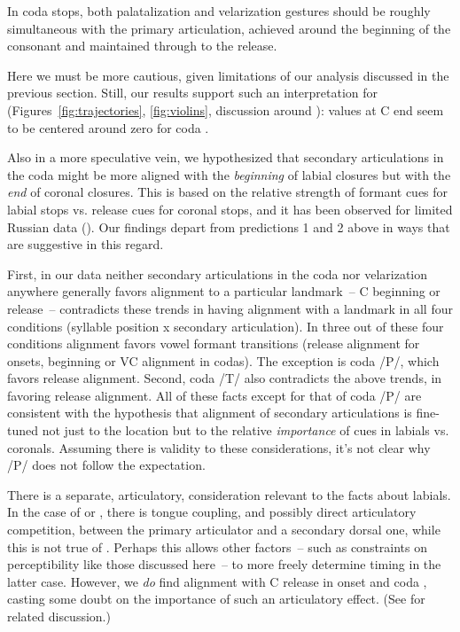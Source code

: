\documentclass[output=paper,colorlinks,citecolor=brown]{langscibook}
\newcommand{\pal}{\ipa{ʲ}}
\newcommand{\vel}{\ipa{ˠ}}
\begin{document}
\begin{exe}
 In coda stops, both palatalization and velarization gestures should be roughly simultaneous with the primary articulation, achieved around the beginning of the consonant and maintained through to the release. 
\end{exe}

Here we must be more cautious, given limitations of our analysis discussed in the previous section. Still, our results support such an interpretation for \ipa{/T\vel\ K\pal\ K\vel/} (Figures~\ref{fig:trajectories}, \ref{fig:violins}, discussion around ): values at C end seem to be centered around zero for coda \ipa{/T\vel\ K\pal\ K\vel/}.

Also in a more speculative vein, we hypothesized that secondary articulations in the coda might be more aligned with the \emph{beginning} of labial closures but with the \emph{end} of coronal closures. This is based on the relative strength of formant cues for labial stops vs. release cues for coronal stops, and it has been observed for limited Russian data (). Our findings depart from predictions 1 and 2 above in ways that are suggestive in this regard.

First, in our data neither secondary articulations in the coda nor velarization anywhere generally favors alignment to a particular landmark~-- C beginning or release~--  contradicts these trends in having alignment with a landmark in all four conditions (syllable position x secondary articulation). In three out of these four conditions alignment favors vowel formant transitions (release alignment for onsets, beginning or VC alignment in codas). The exception is coda /P\vel/, which favors release alignment. Second, coda /T\pal/ also contradicts the above trends, in favoring release alignment. All of these facts except for that of coda /P\vel/ are consistent with the hypothesis that alignment of secondary articulations is fine-tuned not just to the location but to the relative \emph{importance} of cues in labials vs. coronals. Assuming there is validity to these considerations, it's not clear why /P\vel/ does not follow the expectation.

There is a separate, articulatory, consideration relevant to the facts about labials. In the case of  or , there is tongue coupling, and possibly direct articulatory competition, between the primary articulator and a secondary dorsal one, while this is not true of . Perhaps this allows other factors~-- such as constraints on perceptibility like those discussed here~-- to more freely determine timing in the latter case. However, we \emph{do} find alignment with C release in onset \ipa{/T\pal\ K\pal/} and coda \ipa{/T\pal/}, casting some doubt on the importance of such an articulatory effect. (See \citealt{Bennett_etal2018_Conamara_ultrasound} for related discussion.)
\end{document}
